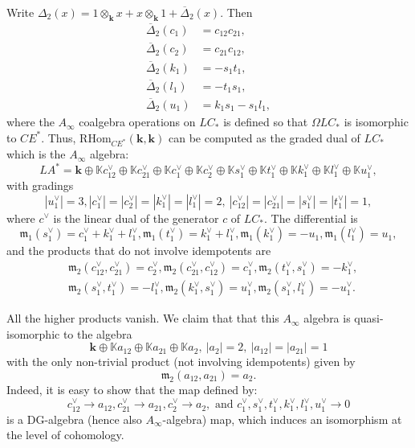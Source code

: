 \documentclass{gtpart}
\renewcommand{\k}{\mathbf{k}}
\newcommand{\K}{\mathbb{K}}
\newcommand{\m}{\mathfrak{m}}
\begin{document}
Write $\Delta_2 (x) = 1 \otimes_\k x + x \otimes_\k 1 +
\overline{\Delta}_2(x)$. Then
\begin{align*}
    \overline{\Delta}_2(c_1) &= c_{12} c_{21}, \\
    \overline{\Delta}_2(c_{2}) &= c_{21} c_{12}, \\ 
    \overline{\Delta}_2(k_1) &= - s_1 t_1, \\ 
    \overline{\Delta}_2(l_1) &= - t_1 s_1, \\
    \overline{\Delta}_2(u_1) &=  k_1 s_1 - s_1 l_1,
\end{align*} 
where the $A_\infty$ coalgebra operations on $LC_* $ is defined so that $\Omega LC_*$ is isomorphic to $CE^*$. Thus, $\mathrm{RHom}_{CE^*}(\k,\k)$ can be computed as the graded dual of $LC_*$ which is the $A_\infty$ algebra: 
\[ LA^*= \k \oplus \K c_{12}^\vee \oplus \K 
c_{21}^\vee \oplus \K c_{1}^\vee \oplus \K c_{2}^\vee \oplus \K s_1^\vee \oplus \K t_1^\vee \oplus
\K k_1^\vee \oplus \K l_1^\vee \oplus \K u_1^\vee,  \]
with gradings  
\[ 
|u_1^\vee|=3, |c_{1}^\vee|=|c_{2}^\vee| = |k_1^\vee|=|l_1^\vee| =  2,\
|c_{12}^\vee|=|c_{21}^\vee|=|s_1^\vee|=|t_1^\vee|=1, 
\]
where $c^{\vee}$ is the linear dual of the generator $c$ of $LC_{\ast}$.
The differential is  \[ \m_1(s_1^\vee) = c_1^\vee + k_1^\vee + l_1^\vee,
\m_1(t_1^\vee)=k_1^\vee + l_1^\vee, \m_1 (k_1^\vee) = -u_1, \m_1(l_1^\vee) = u_1, \] and the
products that do not involve
idempotents are  
\begin{align*} &\m_2(c_{12}^\vee,c_{21}^\vee) = c_2^\vee, \m_2(c_{21}^\vee, c_{12}^\vee) = c_1^\vee ,
    \m_2(t_1^\vee,s_1^\vee) = -k_1^\vee,\\ &\m_2(s_1^\vee,t_1^\vee) = -l_1^\vee,  \m_2(k_1^\vee,s_1^\vee) =
u_1^\vee, \m_2(s_1^\vee,l_1^\vee) = -u_1^\vee.   
\end{align*} 

All the higher
products vanish. 
We claim that that this $A_\infty$ algebra is quasi-isomorphic to the algebra
\[  \k \oplus \mathbb{K} a_{12} \oplus \K a_{21} \oplus \K a_2, \
|a_{2}|=2,\ |a_{12}|=|a_{21}|=1  \]
with the only non-trivial product (not involving idempotents) given by \[ \m_2(a_{12},a_{21}) =a_2.\]  
Indeed, it is easy to show that the map defined by:
\[ c^\vee_{12} \to a_{12}, c_{21}^\vee \to a_{21}, c_2^\vee \to a_2 , \text{\ and \ } c_1^\vee, s_1^\vee,
t_1^\vee, k_1^\vee, l_1^\vee, u_1^\vee\to 0 \]
is a DG-algebra (hence also $A_\infty$-algebra) map, which induces an isomorphism at the level of
cohomology. 
\end{document}
